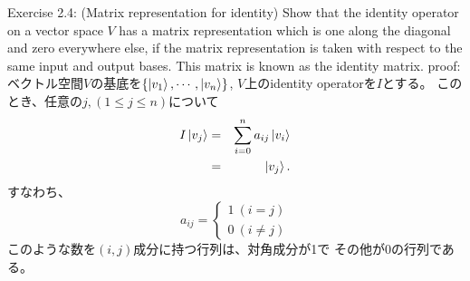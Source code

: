\setcounter{equation}{0}
\begin{flushleft}
{\Large Exercise 2.4: (Matrix representation for identity)}
Show that the identity operator on a vector space $V$ has a matrix representation 
which is one along the diagonal and zero everywhere else, if the matrix representation
is taken with respect to the same input and output bases.
This matrix is known as the identity matrix.
\vspace{0.1in}
\newline
{\large proof:}
ベクトル空間$V$の基底を$\{\ket{v_1}, \cdots, \ket{v_n}\}$, 
$V$上のidentity operatorを$I$とする。
このとき、任意の$j, (1\leq j\leq n)$について
\begin{eqnarray*}
I\ket{v_j}  
&=& \sum_{i=0}^n a_{ij} \ket{v_i} \\
&=& \ket{v_j}.
\end{eqnarray*}
すなわち、
 \[a_{ij} = \begin{cases}
	1 ~(i = j)\\
	0 ~(i \neq j)
	\end{cases}
\]
このような数を$(i,j)$成分に持つ行列は、対角成分が1で
その他が0の行列である。
\end{flushleft}

